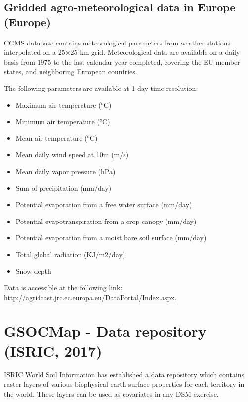 \documentclass[10pt,b5paper,]{book}
\providecommand{\tightlist}{%
  \setlength{\itemsep}{0pt}\setlength{\parskip}{0pt}}
\theoremstyle{definition}
\theoremstyle{definition}
\theoremstyle{definition}
\theoremstyle{remark}
\begin{document}
\hypertarget{gridded-agro-meteorological-data-in-europe-europe}{%
\subsection{Gridded agro-meteorological data in Europe
(Europe)}\label{gridded-agro-meteorological-data-in-europe-europe}}

CGMS database contains meteorological parameters from weather stations
interpolated on a 25×25 km grid. Meteorological data are available on a
daily basis from 1975 to the last calendar year completed, covering the
EU member states, and neighboring European countries.

The following parameters are available at 1-day time resolution:

\begin{itemize}
\tightlist
\item
  Maximum air temperature (°C)
\item
  Minimum air temperature (°C)
\item
  Mean air temperature (°C)
\item
  Mean daily wind speed at 10m (m/s)
\item
  Mean daily vapor pressure (hPa)
\item
  Sum of precipitation (mm/day)
\item
  Potential evaporation from a free water surface (mm/day)
\item
  Potential evapotranspiration from a crop canopy (mm/day)
\item
  Potential evaporation from a moist bare soil surface (mm/day)
\item
  Total global radiation (KJ/m2/day)
\item
  Snow depth
\end{itemize}

Data is accessible at the following link:
\url{http://agri4cast.jrc.ec.europa.eu/DataPortal/Index.aspx}.

\hypertarget{GSOCDataRepo}{%
\section{GSOCMap - Data repository (ISRIC, 2017)}\label{GSOCDataRepo}}

ISRIC World Soil Information has established a data repository which
contains raster layers of various biophysical earth surface properties
for each territory in the world. These layers can be used as covariates
in any DSM exercise.
\end{document}
